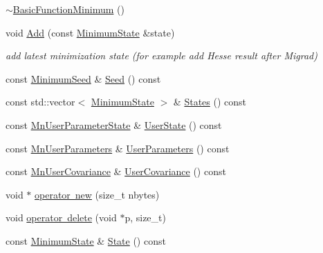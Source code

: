 \begin{DoxyCompactItemize}
\item 
\mbox{\hyperlink{classROOT_1_1Minuit2_1_1BasicFunctionMinimum_a8ed0b5582b668d53022197f2540df4e7}{$\sim$\+Basic\+Function\+Minimum}} ()
\item 
void \mbox{\hyperlink{classROOT_1_1Minuit2_1_1BasicFunctionMinimum_abd32f932e7a26883723b33c4a1402a85}{Add}} (const \mbox{\hyperlink{classROOT_1_1Minuit2_1_1MinimumState}{Minimum\+State}} \&state)
\begin{DoxyCompactList}\small\item\em add latest minimization state (for example add Hesse result after Migrad) \end{DoxyCompactList}\item 
const \mbox{\hyperlink{classROOT_1_1Minuit2_1_1MinimumSeed}{Minimum\+Seed}} \& \mbox{\hyperlink{classROOT_1_1Minuit2_1_1BasicFunctionMinimum_a925aba07b861d7b3d1e5386411a5ea2f}{Seed}} () const
\item 
const std\+::vector$<$ \mbox{\hyperlink{classROOT_1_1Minuit2_1_1MinimumState}{Minimum\+State}} $>$ \& \mbox{\hyperlink{classROOT_1_1Minuit2_1_1BasicFunctionMinimum_a89080776340dc1cad0d73357a6c4b401}{States}} () const
\item 
const \mbox{\hyperlink{classROOT_1_1Minuit2_1_1MnUserParameterState}{Mn\+User\+Parameter\+State}} \& \mbox{\hyperlink{classROOT_1_1Minuit2_1_1BasicFunctionMinimum_ac1757a094afe32c23b548fafaff5acc1}{User\+State}} () const
\item 
const \mbox{\hyperlink{classROOT_1_1Minuit2_1_1MnUserParameters}{Mn\+User\+Parameters}} \& \mbox{\hyperlink{classROOT_1_1Minuit2_1_1BasicFunctionMinimum_aa6fa4f1678939015849b6a2ab6023238}{User\+Parameters}} () const
\item 
const \mbox{\hyperlink{classROOT_1_1Minuit2_1_1MnUserCovariance}{Mn\+User\+Covariance}} \& \mbox{\hyperlink{classROOT_1_1Minuit2_1_1BasicFunctionMinimum_a4f06adfe70411becfe7aa48f6bce1f22}{User\+Covariance}} () const
\item 
void $\ast$ \mbox{\hyperlink{classROOT_1_1Minuit2_1_1BasicFunctionMinimum_a49a32bdb3ff21202fcfa9a9e42015b8f}{operator new}} (size\+\_\+t nbytes)
\item 
void \mbox{\hyperlink{classROOT_1_1Minuit2_1_1BasicFunctionMinimum_ab9d53fd0c21ac6456afdb233e4cbaf1b}{operator delete}} (void $\ast$p, size\+\_\+t)
\item 
const \mbox{\hyperlink{classROOT_1_1Minuit2_1_1MinimumState}{Minimum\+State}} \& \mbox{\hyperlink{classROOT_1_1Minuit2_1_1BasicFunctionMinimum_a57c7f1a6d3551fd329698e0fc9424fec}{State}} () const

\end{DoxyCompactItemize}
